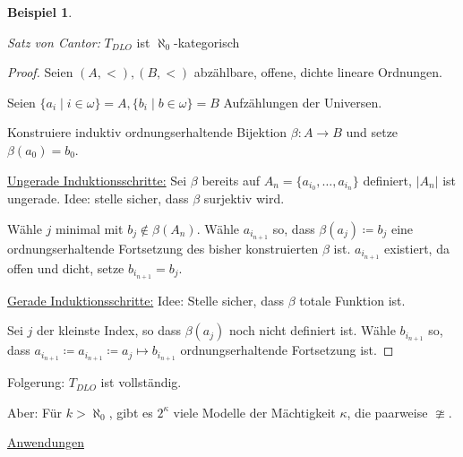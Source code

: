 \documentclass[12pt,parskip=full]{scrartcl}
\newcommand{\abs}[1]{{\left| #1 \right|}}
\newcommand{\heading}{\underline}
\theoremstyle{definition}
\newtheorem{example}[theorem]{Beispiel}
\begin{document}
\begin{example}
\begin{enumerate}
			\textit{Satz von Cantor:} $T_{DLO}$ ist $\aleph_0$-kategorisch
			
			\begin{proof}
				Seien $(A, <), (B, <)$ abzählbare, offene, dichte lineare Ordnungen.
				
				Seien $\{ a_i \mid i \in \omega \} = A, \{ b_i \mid b \in \omega \} = B$ Aufzählungen der Universen.
				
				Konstruiere induktiv ordnungserhaltende Bijektion $\beta: A \to B$ und setze $\beta(a_0) = b_0$.
				
				\heading{Ungerade Induktionsschritte:} Sei $\beta$ bereits auf $A_n = \{ a_{i_0}, \dots, a_{i_n} \}$ definiert, $\abs{A_n}$ ist ungerade. Idee: stelle sicher, dass $\beta$ surjektiv wird.
				
				Wähle $j$ minimal mit $b_j \notin \beta(A_n)$. Wähle $a_{i_{n+1}}$ so, dass $\beta(a_j) \coloneqq b_j$ eine ordnungserhaltende Fortsetzung des bisher konstruierten $\beta$ ist. $a_{i_{n+1}}$ existiert, da offen und dicht, setze $b_{i_{n+1}} = b_j$.
				
				\heading{Gerade Induktionsschritte:} Idee: Stelle sicher, dass $\beta$ totale Funktion ist.
				
				Sei $j$ der kleinste Index, so dass $\beta(a_j)$ noch nicht definiert ist. Wähle $b_{i_{n+1}}$ so, dass $a_{i_{n+1}} \coloneqq a_{i_{n+1}} \coloneqq a_j \mapsto b_{i_{n+1}}$ ordnungserhaltende Fortsetzung ist.
			\end{proof}
		
			Folgerung: $T_{DLO}$ ist vollständig.
			
			Aber: Für $k > \aleph_0$, gibt es $2^\kappa$ viele Modelle der Mächtigkeit $\kappa$, die paarweise $\ncong$.
		\end{enumerate}
	\end{example}

	\heading{Anwendungen}
	
\end{document}
